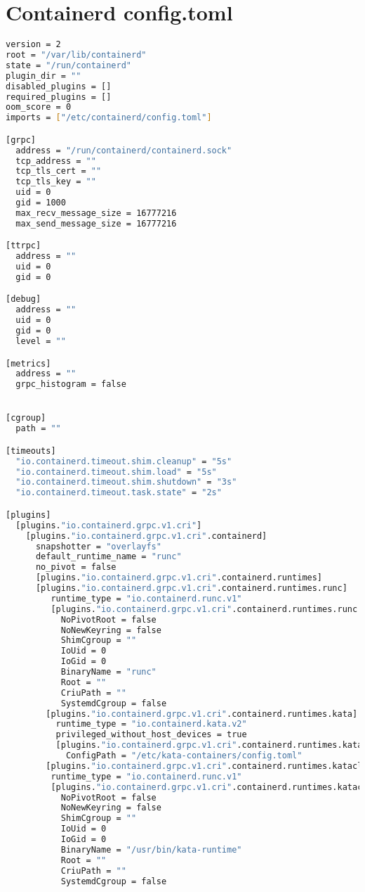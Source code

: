 \section{Containerd config.toml}
\hfill \newline
\label{app:containerd_config}
\begin{lstlisting}[language=bash]
version = 2
root = "/var/lib/containerd"
state = "/run/containerd"
plugin_dir = ""
disabled_plugins = []
required_plugins = []
oom_score = 0
imports = ["/etc/containerd/config.toml"]

[grpc]
  address = "/run/containerd/containerd.sock"
  tcp_address = ""
  tcp_tls_cert = ""
  tcp_tls_key = ""
  uid = 0
  gid = 1000
  max_recv_message_size = 16777216
  max_send_message_size = 16777216

[ttrpc]
  address = ""
  uid = 0
  gid = 0

[debug]
  address = ""
  uid = 0
  gid = 0
  level = ""

[metrics]
  address = ""
  grpc_histogram = false


[cgroup]
  path = ""

[timeouts]
  "io.containerd.timeout.shim.cleanup" = "5s"
  "io.containerd.timeout.shim.load" = "5s"
  "io.containerd.timeout.shim.shutdown" = "3s"
  "io.containerd.timeout.task.state" = "2s"

[plugins]
  [plugins."io.containerd.grpc.v1.cri"]
    [plugins."io.containerd.grpc.v1.cri".containerd]
      snapshotter = "overlayfs"
      default_runtime_name = "runc"
      no_pivot = false
      [plugins."io.containerd.grpc.v1.cri".containerd.runtimes]
      [plugins."io.containerd.grpc.v1.cri".containerd.runtimes.runc]
         runtime_type = "io.containerd.runc.v1"
         [plugins."io.containerd.grpc.v1.cri".containerd.runtimes.runc.options]
           NoPivotRoot = false
           NoNewKeyring = false
           ShimCgroup = ""
           IoUid = 0
           IoGid = 0
           BinaryName = "runc"
           Root = ""
           CriuPath = ""
           SystemdCgroup = false
        [plugins."io.containerd.grpc.v1.cri".containerd.runtimes.kata]
          runtime_type = "io.containerd.kata.v2"
          privileged_without_host_devices = true
          [plugins."io.containerd.grpc.v1.cri".containerd.runtimes.kata.options]
            ConfigPath = "/etc/kata-containers/config.toml"
        [plugins."io.containerd.grpc.v1.cri".containerd.runtimes.katacli]
         runtime_type = "io.containerd.runc.v1"
         [plugins."io.containerd.grpc.v1.cri".containerd.runtimes.katacli.options]
           NoPivotRoot = false
           NoNewKeyring = false
           ShimCgroup = ""
           IoUid = 0
           IoGid = 0
           BinaryName = "/usr/bin/kata-runtime"
           Root = ""
           CriuPath = ""
           SystemdCgroup = false
\end{lstlisting}

